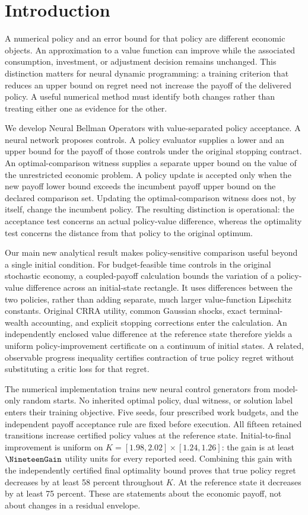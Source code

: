\section{Introduction}\label{sec:introduction}
A numerical policy and an error bound for that policy are different economic objects. An approximation to a value function can improve while the associated consumption, investment, or adjustment decision remains unchanged. This distinction matters for neural dynamic programming: a training criterion that reduces an upper bound on regret need not increase the payoff of the delivered policy. A useful numerical method must identify both changes rather than treating either one as evidence for the other.

We develop Neural Bellman Operators with value-separated policy acceptance. A neural network proposes controls. A policy evaluator supplies a lower and an upper bound for the payoff of those controls under the original stopping contract. An optimal-comparison witness supplies a separate upper bound on the value of the unrestricted economic problem. A policy update is accepted only when the new payoff lower bound exceeds the incumbent payoff upper bound on the declared comparison set. Updating the optimal-comparison witness does not, by itself, change the incumbent policy. The resulting distinction is operational: the acceptance test concerns an actual policy-value difference, whereas the optimality test concerns the distance from that policy to the original optimum.

Our main new analytical result makes policy-sensitive comparison useful beyond a single initial condition. For budget-feasible time controls in the original stochastic economy, a coupled-payoff calculation bounds the variation of a policy-value difference across an initial-state rectangle. It uses differences between the two policies, rather than adding separate, much larger value-function Lipschitz constants. Original CRRA utility, common Gaussian shocks, exact terminal-wealth accounting, and explicit stopping corrections enter the calculation. An independently enclosed value difference at the reference state therefore yields a uniform policy-improvement certificate on a continuum of initial states. A related, observable progress inequality certifies contraction of true policy regret without substituting a critic loss for that regret.

The numerical implementation trains new neural control generators from model-only random starts. No inherited optimal policy, dual witness, or solution label enters their training objective. Five seeds, four prescribed work budgets, and the independent payoff acceptance rule are fixed before execution. All fifteen retained transitions increase certified policy values at the reference state. Initial-to-final improvement is uniform on $K=[1.98,2.02]\times[1.24,1.26]$: the gain is at least $\NineteenGain$ utility units for every reported seed. Combining this gain with the independently certified final optimality bound proves that true policy regret decreases by at least 58 percent throughout $K$. At the reference state it decreases by at least 75 percent. These are statements about the economic payoff, not about changes in a residual envelope.

